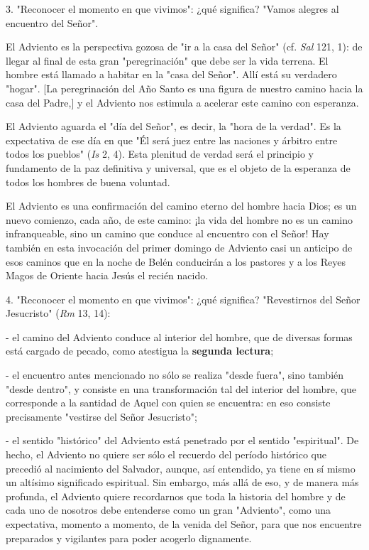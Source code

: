 \begin{body}
	3. "Reconocer el momento en que vivimos": ¿qué significa? "Vamos alegres al encuentro del Señor".
	
	El Adviento es la perspectiva gozosa de "ir a la casa del Señor" (cf. \emph{Sal} 121, 1): de llegar al final de esta gran "peregrinación" que debe ser la vida terrena. El hombre está llamado a habitar en la "casa del Señor". Allí está su verdadero "hogar". {[}La peregrinación del Año Santo es una figura de nuestro camino hacia la casa del Padre,{]} y el Adviento nos estimula a acelerar este camino con esperanza.
	
	El Adviento aguarda el "día del Señor", es decir, la "hora de la verdad". Es la expectativa de ese día en que "Él será juez entre las naciones y árbitro entre todos los pueblos" (\emph{Is} 2, 4). Esta plenitud de verdad será el principio y fundamento de la paz definitiva y universal, que es el objeto de la esperanza de todos los hombres de buena voluntad.
	
	El Adviento es una confirmación del camino eterno del hombre hacia Dios; es un nuevo comienzo, cada año, de este camino: ¡la vida del hombre no es un camino infranqueable, sino un camino que conduce al encuentro con el Señor! Hay también en esta invocación del primer domingo de Adviento casi un anticipo de esos caminos que en la noche de Belén conducirán a los pastores y a los Reyes Magos de Oriente hacia Jesús el recién nacido.
	
	4. "Reconocer el momento en que vivimos": ¿qué significa? "Revestirnos del Señor Jesucristo" (\emph{Rm} 13, 14):
	
	- el camino del Adviento conduce al interior del hombre, que de diversas formas está cargado de pecado, como atestigua la \textbf{segunda lectura};
	
	- el encuentro antes mencionado no sólo se realiza "desde fuera", sino también "desde dentro", y consiste en una transformación tal del interior del hombre, que corresponde a la santidad de Aquel con quien se encuentra: en eso consiste precisamente "vestirse del Señor Jesucristo";
	
	- el sentido "histórico" del Adviento está penetrado por el sentido "espiritual". De hecho, el Adviento no quiere ser sólo el recuerdo del período histórico que precedió al nacimiento del Salvador, aunque, así entendido, ya tiene en sí mismo un altísimo significado espiritual. Sin embargo, más allá de eso, y de manera más profunda, el Adviento quiere recordarnos que toda la historia del hombre y de cada uno de nosotros debe entenderse como un gran "Adviento", como una expectativa, momento a momento, de la venida del Señor, para que nos encuentre preparados y vigilantes para poder acogerlo dignamente.
	

\end{body}
